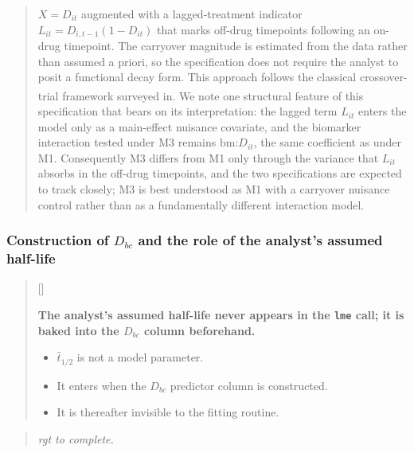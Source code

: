 \documentclass[
  11pt,
]{article}
\newcounter{pgraph}
\newenvironment{bullets}{%
  \stepcounter{pgraph}%
  \begin{quote}\small\sffamily\color[gray]{0.30}%
  {\normalfont\scriptsize\color[gray]{0.58}[\thepgraph]\enspace}}{%
  \end{quote}}
\newenvironment{rgt}{%
  \begin{quote}\small\itshape\color[RGB]{20,60,160}}{%
  \end{quote}}
\newenvironment{orig}{%
  \begin{quote}\normalsize\color[gray]{0.55}}{%
  \end{quote}}
\begin{document}
\begin{orig}
\(X = D_{it}\) augmented with a lagged-treatment indicator
\(L_{it} = D_{i,t-1}(1 - D_{it})\) that marks off-drug timepoints
following an on-drug timepoint. The carryover magnitude is
estimated from the data rather than assumed a priori, so the
specification does not require the analyst to posit a functional
decay form. This approach follows the classical crossover-trial
framework surveyed in\textsuperscript{}. We note one structural
feature of this specification that bears on its interpretation: the
lagged term \(L_{it}\) enters the model only as a main-effect
nuisance covariate, and the biomarker interaction tested under M3
remains \(\text{bm:}D_{it}\), the same coefficient as under M1.
Consequently M3 differs from M1 only through the variance that
\(L_{it}\) absorbs in the off-drug timepoints, and the two
specifications are expected to track closely; M3 is best understood
as M1 with a carryover nuisance control rather than as a
fundamentally different interaction model.

\end{orig}

\subsubsection{\texorpdfstring{Construction of \(D_{bc}\) and the role of the analyst's assumed half-life}{Construction of D\_\{bc\} and the role of the analyst's assumed half-life}}\label{construction-of-d_bc-and-the-role-of-the-analysts-assumed-half-life}

\begin{bullets}

\textbf{The analyst's assumed half-life never appears in the
\texttt{lme} call; it is baked into the $D_{bc}$ column beforehand.}

\begin{itemize}\setlength{\itemsep}{2pt}\setlength{\parskip}{0pt}
\item $\hat{t}_{1/2}$ is not a model parameter.
\item It enters when the $D_{bc}$ predictor column is constructed.
\item It is thereafter invisible to the fitting routine.
\end{itemize}

\end{bullets}

\begin{rgt}
rgt to complete.

\end{rgt}
\end{document}
